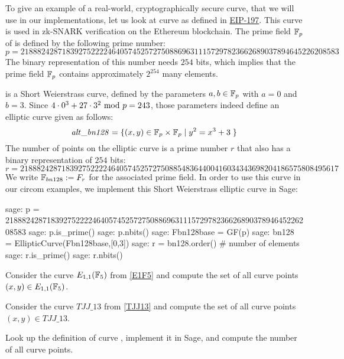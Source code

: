 \begin{example}\label{BN128}
To give an example of a real-world, cryptographically secure curve, that we will use in our  implementations, let us look at curve  as defined in \href{https://github.com/ethereum/EIPs/blob/master/EIPS/eip-197.md}{EIP-197}. This curve is used in zk-SNARK verification on the Ethereum blockchain. The prime field $\mathbb{F}_p$ of  is defined by the following prime number:
$$
p = \scriptstyle 21888242871839275222246405745257275088696311157297823662689037894645226208583
$$
The binary representation of this number needs $254$ bits, which implies that the prime field $\mathbb{F}_p$  contains approximately $2^{254}$ many elements. 

 is a Short Weierstrass curve, defined by the parameters $a,b\in \mathbb{F}_p$ with $a=0$ and $b=3$. Since $4\cdot 0^3 + 27\cdot 3^2 \text{ mod } p=243$, those parameters indeed define an elliptic curve given as follows:
$$
\mathit{alt\_bn128} = \{(x,y)\in \mathbb{F}_p\times \mathbb{F}_p \;|\; y^2 = x^3 +3\;\} 
$$
The number of points on the elliptic curve  is a prime number $r$ that also has a binary representation of $254$ bits:
$$
r = \scriptstyle 21888242871839275222246405745257275088548364400416034343698204186575808495617
$$
We write $\mathbb{F}_{bn128}:=F_r$ for the associated prime field. In order to use this curve in our circom examples, we implement this Short Weierstrass elliptic curve in Sage:
\begin{sagecommandline}
sage: p = 21888242871839275222246405745257275088696311157297823662689037894645226208583
sage: p.is_prime()
sage: p.nbits()
sage: Fbn128base = GF(p)
sage: bn128 = EllipticCurve(Fbn128base,[0,3])
sage: r = bn128.order() # number of elements
sage: r.is_prime()
sage: r.nbits()
\end{sagecommandline}
\end{example}

\begin{exercise} Consider the curve $E_{1,1}(\mathbb{F}_5)$ from \examplename{} \ref{E1F5} and compute the set of all curve points $(x,y)\in E_{1,1}(\mathbb{F}_5)$.
\end{exercise}
\begin{exercise} Consider the curve $TJJ\_13$ from \examplename{} \ref{TJJ13} and compute the set of all curve points $(x,y)\in TJJ\_13$.
\end{exercise}
\begin{exercise}
Look up the definition of curve , implement it in Sage, and compute the number of all curve points.
\end{exercise}
